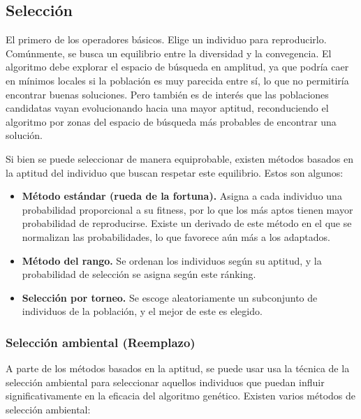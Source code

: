 \subsection{Selección}
\label{Seleccion}

El primero de los operadores básicos. Elige un individuo para reproducirlo. Comúnmente, se busca un equilibrio entre la diversidad y la convegencia. El algoritmo debe explorar el espacio de búsqueda en amplitud, ya que podría caer en mínimos locales si la población es muy parecida entre sí, lo que no permitiría encontrar buenas soluciones. Pero también es de interés que las poblaciones candidatas vayan evolucionando hacia una mayor aptitud, reconduciendo el algoritmo por zonas del espacio de búsqueda más probables de encontrar una solución.

Si bien se puede seleccionar de manera equiprobable, existen métodos basados en la aptitud del individuo que buscan respetar este equilibrio. Estos son algunos:

\begin{itemize}
  \item \textbf{Método estándar (rueda de la fortuna).} Asigna a cada individuo una probabilidad proporcional a su fitness, por lo que los más aptos tienen mayor probabilidad de reproducirse. Existe un derivado de este método en el que se normalizan las probabilidades, lo que favorece aún más a los adaptados.
  \item \textbf{Método del rango.} Se ordenan los individuos según su aptitud, y la probabilidad de selección se asigna según este ránking.
  \item \textbf{Selección por torneo.} Se escoge aleatoriamente un subconjunto de individuos de la población, y el mejor de este es elegido.
\end{itemize}

\subsubsection{Selección ambiental (Reemplazo)}

A parte de los métodos basados en la aptitud, se puede usar usa la técnica de la selección ambiental para seleccionar aquellos individuos que puedan influir significativamente en la eficacia del algoritmo genético. Existen varios métodos de selección ambiental:

